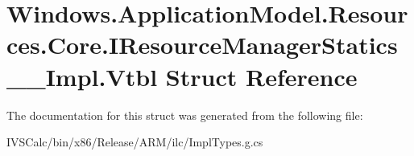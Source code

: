 \hypertarget{struct_windows_1_1_application_model_1_1_resources_1_1_core_1_1_i_resource_manager_statics_____impl_1_1_vtbl}{}\section{Windows.\+Application\+Model.\+Resources.\+Core.\+I\+Resource\+Manager\+Statics\+\_\+\+\_\+\+Impl.\+Vtbl Struct Reference}
\label{struct_windows_1_1_application_model_1_1_resources_1_1_core_1_1_i_resource_manager_statics_____impl_1_1_vtbl}


The documentation for this struct was generated from the following file\+:\begin{DoxyCompactItemize}
\item 
I\+V\+S\+Calc/bin/x86/\+Release/\+A\+R\+M/ilc/Impl\+Types.\+g.\+cs\end{DoxyCompactItemize}
